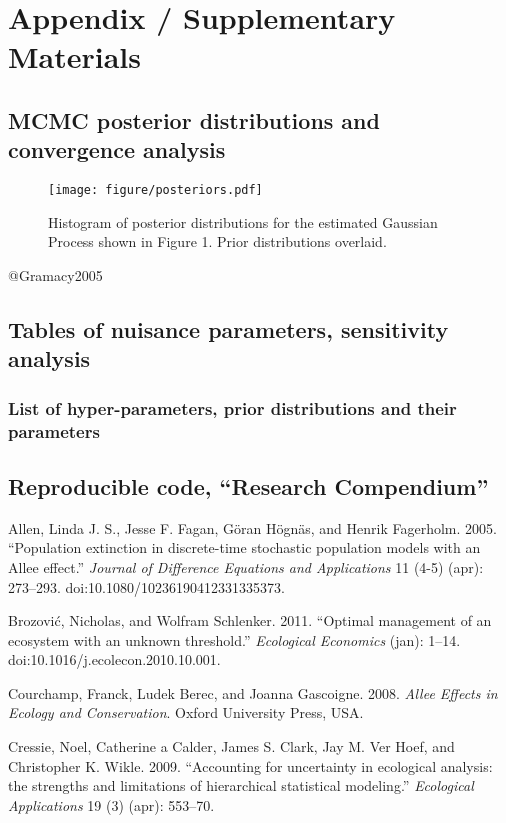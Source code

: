 \documentclass[author-year, review]{elsarticle} %
\makeatletter
\def\maxwidth{\ifdim\Gin@nat@width>\linewidth\linewidth
\else\Gin@nat@width\fi}
\let\Oldincludegraphics\includegraphics
\renewcommand{\includegraphics}[1]{\Oldincludegraphics[width=\maxwidth]{#1}}
\makeatother
\begin{document}
\section{Appendix / Supplementary Materials}

\subsection{MCMC posterior distributions and convergence analysis}

\begin{figure}[htbp]
\centering
\texttt{[image: figure/posteriors.pdf]}
\caption{Histogram of posterior distributions for the estimated Gaussian
Process shown in Figure 1. Prior distributions overlaid.}
\end{figure}

@Gramacy2005

\subsection{Tables of nuisance parameters, sensitivity analysis}

\subsubsection{List of hyper-parameters, prior distributions and their
parameters}

\subsection{Reproducible code, ``Research Compendium''}

Allen, Linda J. S., Jesse F. Fagan, Göran Högnäs, and Henrik Fagerholm.
2005. ``Population extinction in discrete-time stochastic population
models with an Allee effect.'' \emph{Journal of Difference Equations and
Applications} 11 (4-5) (apr): 273--293.
doi:10.1080/10236190412331335373.

Brozović, Nicholas, and Wolfram Schlenker. 2011. ``Optimal management of
an ecosystem with an unknown threshold.'' \emph{Ecological Economics}
(jan): 1--14. doi:10.1016/j.ecolecon.2010.10.001.

Courchamp, Franck, Ludek Berec, and Joanna Gascoigne. 2008. \emph{Allee
Effects in Ecology and Conservation}. Oxford University Press, USA.

Cressie, Noel, Catherine a Calder, James S. Clark, Jay M. Ver Hoef, and
Christopher K. Wikle. 2009. ``Accounting for uncertainty in ecological
analysis: the strengths and limitations of hierarchical statistical
modeling.'' \emph{Ecological Applications} 19 (3) (apr): 553--70.
\end{document}
